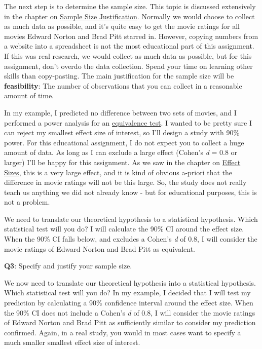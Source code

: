 \documentclass[
  oneside]{krantz}
\begin{document}
The next step is to determine the sample size. This topic is discussed extensively in the chapter on \protect\hyperlink{power}{Sample Size Justification}. Normally we would choose to collect as much data as possible, and it's quite easy to get the movie ratings for all movies Edward Norton and Brad Pitt starred in. However, copying numbers from a website into a spreadsheet is not the most educational part of this assignment. If this was real research, we would collect as much data as possible, but for this assignment, don't overdo the data collection. Spend your time on learning other skills than copy-pasting. The main justification for the sample size will be \textbf{feasibility}: The number of observations that you can collect in a reasonable amount of time.

In my example, I predicted no difference between two sets of movies, and I performed a power
analysis for an \protect\hyperlink{equivalencetest}{equivalence test}. I wanted to be pretty sure I can reject my smallest effect size of interest, so I'll design a study with 90\% power. For this educational assignment, I do not expect you to collect a huge amount of data. As long as I can exclude a large effect (Cohen's \emph{d} = 0.8 or larger) I'll be happy for this assignment. As we saw in the chapter on \protect\hyperlink{effectsize}{Effect Sizes}, this is a very large effect, and it is kind of obvious a-priori that the difference in movie ratings will not be this large. So, the study does not really teach us anything we did not already know - but for educational purposes, this is not a problem.

We need to translate our theoretical hypothesis to a statistical hypothesis.
Which statistical test will you do? I will calculate the 90\% CI around the
effect size. When the 90\% CI falls below, and excludes a Cohen's \emph{d} of 0.8, I
will consider the movie ratings of Edward Norton and Brad Pitt as equivalent.

\textbf{Q3}: Specify and justify your sample size.

We now need to translate our theoretical hypothesis into a statistical hypothesis. Which statistical test will you do? In my example, I decided that I will test my prediction by calculating a 90\% confidence interval around the effect size. When the 90\% CI does not include a Cohen's \emph{d} of 0.8, I will consider the movie ratings of Edward Norton and Brad Pitt as sufficiently similar to consider my prediction confirmed. Again, in a real study, you would in most cases want to specify a much smaller smallest effect size of interest.
\end{document}
